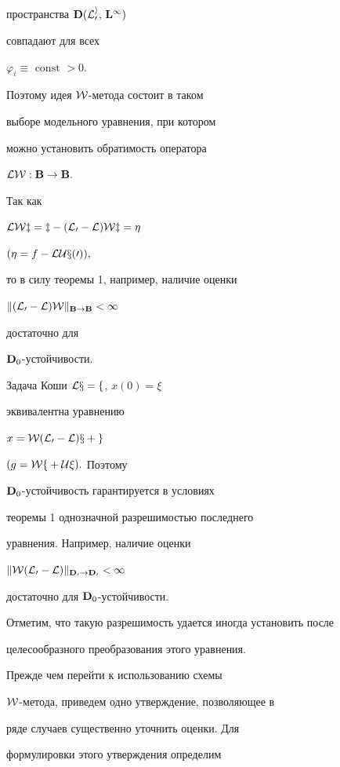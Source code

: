 пространства $\bold D(\cal L_0^i,\,\bold L^\infty)$


совпадают для всех


$\varphi_i \equiv\text{ const } > 0.$


Поэтому идея $\cal W$-метода состоит в таком


выборе модельного уравнения, при котором


можно установить обратимость оператора


$\cal L\cal W:\bold B\to\bold B.$


Так как


$\cal L\cal W z = z - (\cal L_0 -\cal L) \cal W z = \eta$\;


$(\eta = f - \cal LUx(0)),$


то в силу теоремы 1, например, наличие оценки


$\|(\cal L_0 - \cal L)\cal W\|_{\bold B\to\bold B} < 1$


достаточно для\linebreak




$\bold D_0$-устойчивости.





Задача Коши $\cal Lx =f$, $x(0) = \xi$


эквивалентна уравнению


$x = \cal W(\cal L_0 - \cal L) x + g$\;


$(g = \cal W f + \cal U\xi).$ Поэтому


$\bold D_0$-устойчивость гарантируется в условиях


теоремы 1 однозначной разрешимостью последнего


уравнения. Например, наличие оценки


$\|\cal W(\cal L_0-\cal L)\|_{\bold D_0\to\bold D_0} < 1$


достаточно для $\bold D_0$-устойчивости.


Отметим, что такую разрешимость удается иногда установить после


целесообразного преобразования этого уравнения.





Прежде чем перейти к использованию схемы


$\cal W$-метода, приведем одно утверждение, позволяющее в


ряде случаев существенно уточнить оценки. Для


формулировки этого утверждения определим


